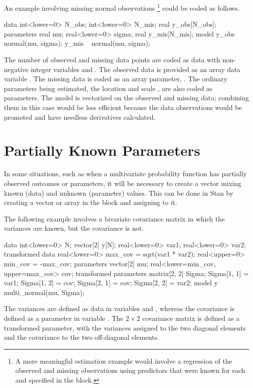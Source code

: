 An example involving missing normal observations%
%
\footnote{A more meaningful estimation example would involve a
  regression of the observed and missing observations using predictors
  that were known for each and specified in the  block.}
%
could be coded as follows.
%
\begin{stancode}
data {
  int<lower=0> N_obs;
  int<lower=0> N_mis;
  real y_obs[N_obs];
}
parameters {
  real mu;
  real<lower=0> sigma;
  real y_mis[N_mis];
}
model {
  y_obs ~ normal(mu, sigma);
  y_mis ~ normal(mu, sigma);
}
\end{stancode}
%
The number of observed and missing data points are coded as data with
non-negative integer variables  and .  The
observed data is provided as an array data variable .
The missing data is coded as an array parameter, .  The
ordinary parameters being estimated, the location  and scale
, are also coded as parameters.  The model is vectorized
on the observed and missing data; combining them in this case would be
less efficient because the data observations would be promoted and
have needless derivatives calculated.


\section{Partially Known Parameters}\label{partially-known-parameters.section}

In some situations, such as when a multivariate probability function
has partially observed outcomes or parameters, it will be necessary to
create a vector mixing known (data) and unknown (parameter) values.
This can be done in Stan by creating a vector or array in the
 block and assigning to it.

The following example involves a bivariate covariance matrix in which the
variances are known, but the covariance is not.
%
\begin{stancode}
data {
  int<lower=0> N;
  vector[2] y[N];
  real<lower=0> var1;     real<lower=0> var2;
}
transformed data {
  real<lower=0> max_cov = sqrt(var1 * var2);
  real<upper=0> min_cov = -max_cov;
}
parameters {
  vector[2] mu;
  real<lower=min_cov, upper=max_cov> cov;
}
transformed parameters {
  matrix[2, 2] Sigma;
  Sigma[1, 1] = var1;     Sigma[1, 2] = cov;
  Sigma[2, 1] = cov;      Sigma[2, 2] = var2;
}
model {
  y ~ multi_normal(mu, Sigma);
}
\end{stancode}
%
The variances are defined as data in variables  and
, whereas the covariance is defined as a parameter in
variable .  The $2 \times 2$ covariance matrix 
is defined as a transformed parameter, with the variances assigned to
the two diagonal elements and the covariance to the two off-diagonal
elements.

